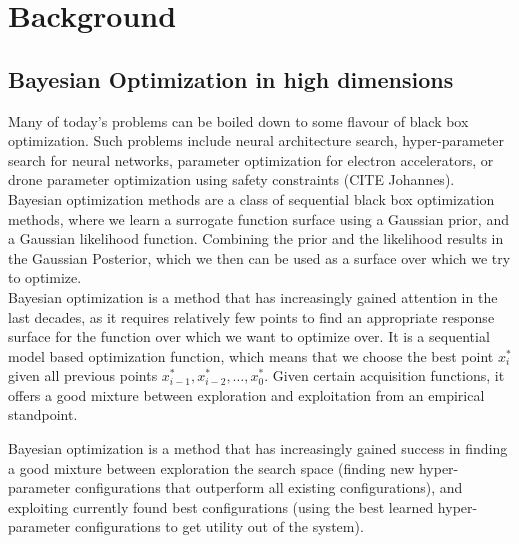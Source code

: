 
\chapter{Background}  %

\ifpdf
    \graphicspath{{Chapter1/Figs/Raster/}{Chapter1/Figs/PDF/}{Chapter1/Figs/}}
\else
    \graphicspath{{Chapter1/Figs/Vector/}{Chapter1/Figs/}}
\fi


\section{Bayesian Optimization in high dimensions} %

Many of today's problems can be boiled down to some flavour of black box optimization. 
Such problems include neural architecture search, hyper-parameter search for neural networks, parameter optimization for electron accelerators, or drone parameter optimization using safety constraints (CITE Johannes). \\

Bayesian optimization methods are a class of sequential black box optimization methods, where we learn a surrogate function surface using a Gaussian prior, and a Gaussian likelihood function.
Combining the prior and the likelihood results in the Gaussian Posterior, which we then can be used as a surface over which we try to optimize. \\

Bayesian optimization is a method that has increasingly gained attention in the last decades, as it requires relatively few points to find an appropriate response surface for the function over which we want to optimize over.
It is a sequential model based optimization function, which means that we choose the best point $x^*_i$ given all previous points $x^*_{i-1}, x^*_{i-2}, \ldots, x^*_{0}$.
Given certain acquisition functions, it offers a good mixture between exploration and exploitation from an empirical standpoint.

Bayesian optimization is a method that has increasingly gained success in finding a good mixture between exploration the search space (finding new hyper-parameter configurations that outperform all existing configurations), and exploiting currently found best configurations (using the best learned hyper-parameter configurations to get utility out of the system). \\


